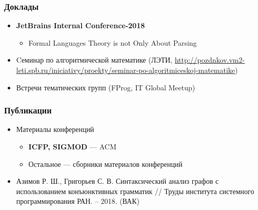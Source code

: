\documentclass[xcolor=table]{beamer}
\begin{document}
\begin{frame}[fragile]
  \transwipe[direction=90]
  \frametitle{Доклады}
\begin{itemize}

      \item \textbf{JetBrains Internal Conference-2018}
      \begin{itemize}
        \item Formal Languages Theory is not Only About Parsing
      \end{itemize}

      \item Cеминар по алгоритмической математике (ЛЭТИ, \url{http://pozdnkov.vm2-leti.spb.ru/iniciativy/proekty/seminar-po-algoritmiceskoj-matematike})

      \item Встречи тематических групп (FProg, IT Global Meetup)

\end{itemize}
\end{frame}


\begin{frame}[fragile]
  \transwipe[direction=90]
  \frametitle{Публикации}
\begin{itemize}
      \item Материалы конференций
        \begin{itemize}
          \item \textbf{ICFP, SIGMOD} --- ACM
          \item Остальное --- сборники материалов конференций
        \end{itemize}
      \item Азимов Р. Ш., Григорьев С. В. Синтаксический анализ графов с использованием конъюнктивных грамматик // Труды института системного программирования РАН. – 2018. (ВАК)
\end{itemize}
\end{frame}
\end{document}
